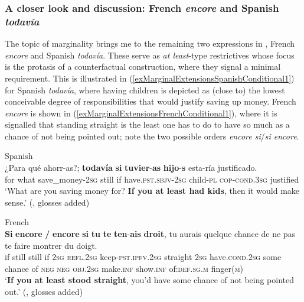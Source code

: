 \subsubsection{A closer look and discussion: French \textit{encore} and Spanish \textit{todavía}} The topic of marginality brings me to the remaining two expressions in , French \textit{encore} and Spanish \textit{todavía}. These serve as \textit{at least}-type restrictives whose focus is the protasis of a counterfactual  construction, where they signal a minimal requirement. This is illustrated in (\ref{exMarginalExtensionsSpanishConditional1}) for Spanish \textit{todavía}, where having children is depicted as (close to) the lowest conceivable degree of responsibilities that would justify saving up money. French \textit{encore} is shown in (\ref{exMarginalExtensionsFrenchConditional1}), where it is signalled that standing straight is the least one has to do to have so much as a chance of not being pointed out; note the two possible orders \textit{encore si}/\textit{si encore}.

\begin{exe}
	\ex
	 Spanish\label{exMarginalExtensionsSpanishConditional1}\\
	\gll ¿Para qué ahorr-as?; \textbf{todavía} \textbf{si} \textbf{tuvier}-\textbf{as} \textbf{hijo}-\textbf{s} esta-ría justificado.\\
	\phantom{¿}for what save\_money-2\textsc{sg} still if have.\textsc{pst}.\textsc{sbjv}-2\textsc{sg} child-\textsc{pl} \textsc{cop}-\textsc{cond}.3\textsc{sg} justified\\
	\glt \lq What are you saving money for? \textbf{If you at least had kids}, then it would make sense.' (\cite[s.v. \textit{todavía}]{RAEDictionary}, glosses added)

	\ex French\label{exMarginalExtensionsFrenchConditional1}\\
	\gll \textbf{Si} \textbf{encore} \textup{\textbf{/}} \textbf{encore} \textbf{si} \textbf{tu} \textbf{te} \textbf{ten}-\textbf{ais} \textbf{droit}, tu aurais quelque chance de ne pas te faire montrer du doigt.\\
	if still {} still if 2\textsc{sg} \textsc{refl}.2\textsc{sg} keep-\textsc{pst}.\textsc{ipfv}.2\textsc{sg} straight 2\textsc{sg} have.\textsc{cond}.2\textsc{sg} some chance of \textsc{neg} \textsc{neg} \textsc{obj}.2\textsc{sg} make.\textsc{inf} show.\textsc{inf} of:\textsc{def}.\textsc{sg}.\textsc{m} finger(\textsc{m})\\
	\glt \lq \textbf{If you at least stood straight}, you'd have some chance of not being pointed out.'  (\cite[83]{VictorriFuchs1996}, glosses added)
\end{exe}

